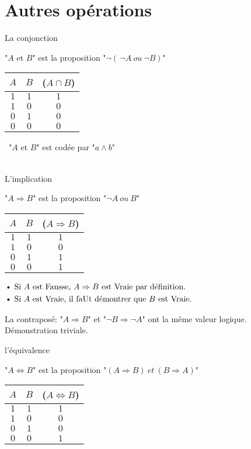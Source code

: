 \documentclass[12pt,twoside,a4paper]{article}
\begin{document}
	\section{Autres op\'erations}
		\begin{liste}
			\item La conjonction
				\begin{defi}"$A$ et $B$" est la proposition "$\neg(\,\neg A\ ou\ \neg B)$"\end{defi}
				\begin{tabular}{ c | c | c  }
					$A$ & $B$ &($A\cap B$)\\\hline 
					$1$&$1$&$1$\\
					$1$&$0$&$0$\\
					$0$&$1$&$0$\\
					$0$&$0$&$0$\\
				\end{tabular} \textbullet\ "$A$ et $B$" est cod\'ee par "$a\land b$"\\\\
			\item L'implication 
				\begin{defi}"$A\Rightarrow B$" est la proposition "$\neg A\ ou\ B$"\end{defi}
				\begin{tabular}{ c | c | c  }
					$A$ & $B$ &($A\Rightarrow B$)\\\hline 
					$1$&$1$&$1$\\
					$1$&$0$&$0$\\
					$0$&$1$&$1$\\
					$0$&$0$&$1$\\
				\end{tabular}
				$\begin{aligned}
					&\text{\textbullet}\ \text{Si }A\text{ est Fausse, }A\Rightarrow B\text{ est Vraie par d\'efinition.}\\
					&\text{\textbullet}\ \text{Si }A\text{ est Vraie, il faUt d\'emontrer que }B\text{ est Vraie.}
				\end{aligned}$
			\item La contrapos\'e: "$A\Rightarrow B$" et "$\neg B\Rightarrow \neg A$" ont la m\^eme valeur logique.\\
				D\'emonstration triviale.\\
			\item l'\'equivalence
				\begin{defi}"$A\Leftrightarrow B$" est la proposition "$(A\Rightarrow B)\ et\ (B\Rightarrow A)$" \end{defi}
				\begin{tabular}{ c | c | c  }
					$A$ & $B$ &($A\Leftrightarrow B$)\\\hline 
					$1$&$1$&$1$\\
					$1$&$0$&$0$\\
					$0$&$1$&$0$\\
					$0$&$0$&$1$\\
				\end{tabular}
		\end{liste}
\end{document}
